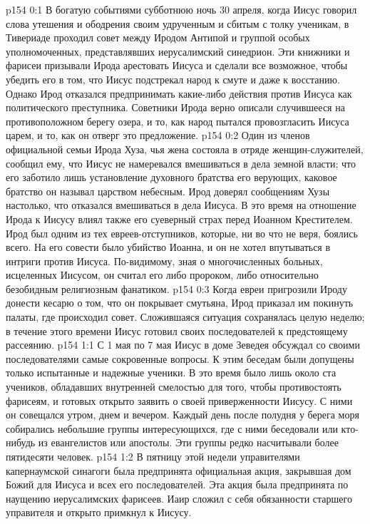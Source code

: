 \author{Комиссия срединников}
\vs p154 0:1 В богатую событиями субботнюю ночь 30 апреля, когда Иисус говорил слова утешения и ободрения своим удрученным и сбитым с толку ученикам, в Тивериаде проходил совет между Иродом Антипой и группой особых уполномоченных, представлявших иерусалимский синедрион. Эти книжники и фарисеи призывали Ирода арестовать Иисуса и сделали все возможное, чтобы убедить его в том, что Иисус подстрекал народ к смуте и даже к восстанию. Однако Ирод отказался предпринимать какие\hyp{}либо действия против Иисуса как политического преступника. Советники Ирода верно описали случившееся на противоположном берегу озера, и то, как народ пытался провозгласить Иисуса царем, и то, как он отверг это предложение.
\vs p154 0:2 Один из членов официальной семьи Ирода Хуза, чья жена состояла в отряде женщин\hyp{}служителей, сообщил ему, что Иисус не намеревался вмешиваться в дела земной власти; что его заботило лишь установление духовного братства его верующих, каковое братство он называл царством небесным. Ирод доверял сообщениям Хузы настолько, что отказался вмешиваться в дела Иисуса. В это время на отношение Ирода к Иисусу влиял также его суеверный страх перед Иоанном Крестителем. Ирод был одним из тех евреев\hyp{}отступников, которые, ни во что не веря, боялись всего. На его совести было убийство Иоанна, и он не хотел впутываться в интриги против Иисуса. По\hyp{}видимому, зная о многочисленных больных, исцеленных Иисусом, он считал его либо пророком, либо относительно безобидным религиозным фанатиком.
\vs p154 0:3 Когда евреи пригрозили Ироду донести кесарю о том, что он покрывает смутьяна, Ирод приказал им покинуть палаты, где происходил совет. Сложившаяся ситуация сохранялась целую неделю; в течение этого времени Иисус готовил своих последователей к предстоящему рассеянию.
\vs p154 1:1 С 1 мая по 7 мая Иисус в доме Зеведея обсуждал со своими последователями самые сокровенные вопросы. К этим беседам были допущены только испытанные и надежные ученики. В это время было лишь около ста учеников, обладавших внутренней смелостью для того, чтобы противостоять фарисеям, и готовых открыто заявить о своей приверженности Иисусу. С ними он совещался утром, днем и вечером. Каждый день после полудня у берега моря собирались небольшие группы интересующихся, где с ними беседовали или кто\hyp{}нибудь из евангелистов или апостолы. Эти группы редко насчитывали более пятидесяти человек.
\vs p154 1:2 В пятницу этой недели управителями капернаумской синагоги была предпринята официальная акция, закрывшая дом Божий для Иисуса и всех его последователей. Эта акция была предпринята по наущению иерусалимских фарисеев. Иаир сложил с себя обязанности старшего управителя и открыто примкнул к Иисусу.
